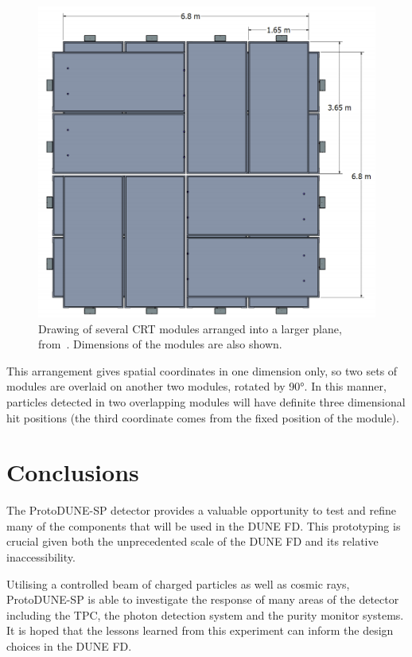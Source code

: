 \begin{figure}[h]
	\centering
	\includegraphics[width=.6\linewidth]{files/figures/protodune_detector/crtModules}
	\caption[Drawing of several CRT modules arranged into a larger plane.]{Drawing of several CRT modules arranged into a larger plane, from~\cite{protodunePerformance}. Dimensions of the modules are also shown.}
	\label{fig:crtModules}
\end{figure}

This arrangement gives spatial coordinates in one dimension only, so two sets of modules are overlaid on another two modules, rotated by \ang{90}. 
In this manner, particles detected in two overlapping modules will have definite three dimensional hit positions (the third coordinate comes from the fixed position of the module).

\section{Conclusions}

The ProtoDUNE-SP detector provides a valuable opportunity to test and refine many of the components that will be used in the DUNE FD.
This prototyping is crucial given both the unprecedented scale of the DUNE FD and its relative inaccessibility. 

Utilising a controlled beam of charged particles as well as cosmic rays, ProtoDUNE-SP is able to investigate the response of many areas of the detector including the TPC, the photon detection system and the purity monitor systems.
It is hoped that the lessons learned from this experiment can inform the design choices in the DUNE FD.
